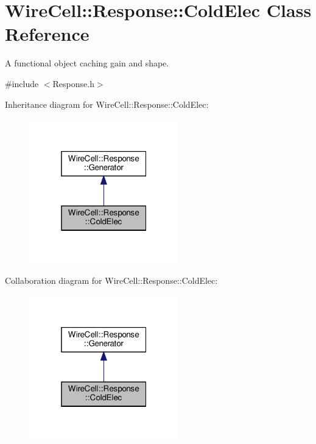\hypertarget{class_wire_cell_1_1_response_1_1_cold_elec}{}\section{Wire\+Cell\+:\+:Response\+:\+:Cold\+Elec Class Reference}
\label{class_wire_cell_1_1_response_1_1_cold_elec}


A functional object caching gain and shape.  




{\ttfamily \#include $<$Response.\+h$>$}



Inheritance diagram for Wire\+Cell\+:\+:Response\+:\+:Cold\+Elec\+:
\nopagebreak
\begin{figure}[H]
\begin{center}
\leavevmode
\includegraphics[width=184pt]{class_wire_cell_1_1_response_1_1_cold_elec__inherit__graph}
\end{center}
\end{figure}


Collaboration diagram for Wire\+Cell\+:\+:Response\+:\+:Cold\+Elec\+:
\nopagebreak
\begin{figure}[H]
\begin{center}
\leavevmode
\includegraphics[width=184pt]{class_wire_cell_1_1_response_1_1_cold_elec__coll__graph}
\end{center}
\end{figure}
